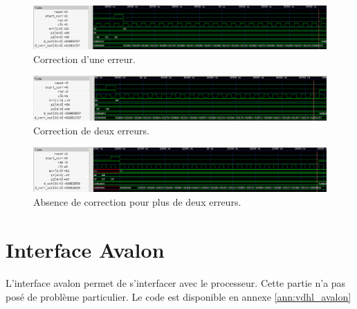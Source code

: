 \documentclass[a4paper, 11pt, svgnames]{report}
\begin{document}
                \begin{figure}[H]
                    \centering
                    \includegraphics[width=\textwidth]{./images/corr_1_err.png}
                    \caption{Correction d'une erreur.}
                    \label{fig:sim_corr_1}
                \end{figure}

                \begin{figure}[H]
                    \centering
                    \includegraphics[width=\textwidth]{./images/corr_2_err.png}
                    \caption{Correction de deux erreurs.}
                    \label{fig:sim_corr_2}
                \end{figure}

                \begin{figure}[H]
                    \centering
                    \includegraphics[width=\textwidth]{./images/corr_2sup_err.png}
                    \caption{Absence de correction pour plus de deux erreurs.}
                    \label{fig:sim_corr_3}
                \end{figure}

        \section{Interface Avalon}
            \paragraph{}
                L'interface avalon permet de s'interfacer avec le processeur. Cette
                partie n'a pas posé de problème particulier. Le code est disponible en annexe
                \ref{ann:vdhl_avalon}
\end{document}
